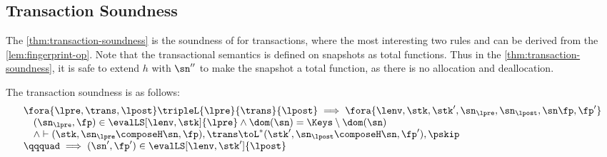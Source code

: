 \subsection{Transaction Soundness}

The \cref{thm:transaction-soundness} is the soundness of for transactions, where the most interesting two rules  and  can be derived from the \cref{lem:fingerprint-op}.
Note that the transactional semantics is defined on snapshots as total functions.
Thus in the \cref{thm:transaction-soundness}, it is safe to extend \( h \) with \( \sn'' \)  to make the snapshot a total function, as there is no allocation and deallocation.

\begin{theorem}
\label{thm:transaction-soundness}
The transaction soundness is as follows:
\[
    \begin{array}{@{}l@{}}
        \fora{ \lpre, \trans, \lpost } \tripleL{\lpre}{\trans}{\lpost}
        \implies 
        \fora{\lenv, \stk, \stk', \sn_\lpre, \sn_\lpost, \sn \fp, \fp' }  \\
        \quad (\sn_\lpre, \fp) \in \evalLS[\lenv, \stk]{\lpre}
        \land \dom(\sn) = \Keys \setminus \dom(\sn) \\
        \quad {} \land \vdash (\stk, \sn_\lpre \composeH \sn, \fp ), \trans \toL^{*}  (\stk', \sn_\lpost \composeH \sn, \fp' ), \pskip  \\
        \qqquad \implies (\sn', \fp') \in \evalLS[\lenv, \stk']{\lpost}
    \end{array}
\]
\end{theorem}
